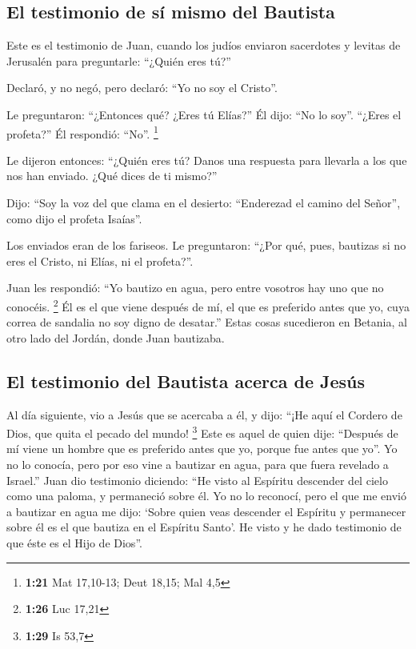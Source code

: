 \hypertarget{el-testimonio-de-suxed-mismo-del-bautista}{%
\subsection{El testimonio de sí mismo del
Bautista}\label{el-testimonio-de-suxed-mismo-del-bautista}}

 Este es el testimonio de Juan, cuando los judíos
enviaron sacerdotes y levitas de Jerusalén para preguntarle: ``¿Quién
eres tú?''

 Declaró, y no negó, pero declaró: ``Yo no soy el
Cristo''.

 Le preguntaron: ``¿Entonces qué? ¿Eres tú Elías?'' Él
dijo: ``No lo soy''. ``¿Eres el profeta?'' Él respondió: ``No''.
\footnote{\textbf{1:21} Mat 17,10-13; Deut 18,15; Mal 4,5}

 Le dijeron entonces: ``¿Quién eres tú? Danos una
respuesta para llevarla a los que nos han enviado. ¿Qué dices de ti
mismo?''

 Dijo: ``Soy la voz del que clama en el desierto:
``Enderezad el camino del Señor'', como dijo el profeta Isaías''.

 Los enviados eran de los fariseos.  Le
preguntaron: ``¿Por qué, pues, bautizas si no eres el Cristo, ni Elías,
ni el profeta?''.

 Juan les respondió: ``Yo bautizo en agua, pero entre
vosotros hay uno que no conocéis. \footnote{\textbf{1:26} Luc 17,21}
 Él es el que viene después de mí, el que es preferido
antes que yo, cuya correa de sandalia no soy digno de desatar.''
 Estas cosas sucedieron en Betania, al otro lado del
Jordán, donde Juan bautizaba.

\hypertarget{el-testimonio-del-bautista-acerca-de-jesuxfas}{%
\subsection{El testimonio del Bautista acerca de
Jesús}\label{el-testimonio-del-bautista-acerca-de-jesuxfas}}

 Al día siguiente, vio a Jesús que se acercaba a él, y
dijo: ``¡He aquí el Cordero de Dios, que quita el pecado del mundo!
\footnote{\textbf{1:29} Is 53,7}  Este es aquel de quien
dije: ``Después de mí viene un hombre que es preferido antes que yo,
porque fue antes que yo''.  Yo no lo conocía, pero por
eso vine a bautizar en agua, para que fuera revelado a Israel.''
 Juan dio testimonio diciendo: ``He visto al Espíritu
descender del cielo como una paloma, y permaneció sobre él.
 Yo no lo reconocí, pero el que me envió a bautizar en
agua me dijo: `Sobre quien veas descender el Espíritu y permanecer sobre
él es el que bautiza en el Espíritu Santo'.  He visto y
he dado testimonio de que éste es el Hijo de Dios''.

